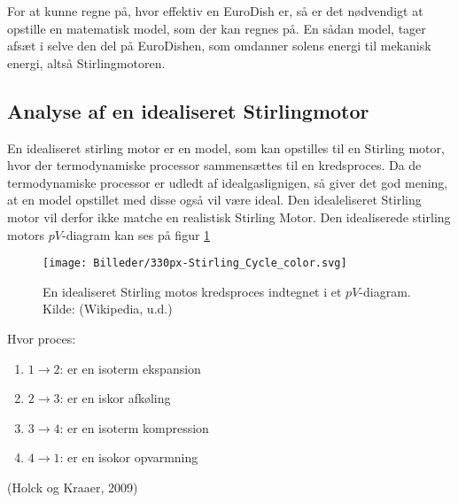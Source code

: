 \documentclass[SRC.tex]{subfiles}
\begin{document}
	
	For at kunne regne på, hvor effektiv en EuroDish er, så er det nødvendigt at opstille
	en matematisk model, som der kan regnes på. En sådan model, tager afsæt i selve den del
	på EuroDishen, som omdanner solens energi til mekanisk energi, altså Stirlingmotoren. 
	
	\subsection{Analyse af en idealiseret Stirlingmotor}
	En idealiseret stirling motor er en model, som kan opstilles til en 
	Stirling motor, hvor der termodynamiske processor sammensættes til en kredsproces. Da 
	de termodynamiske processor er udledt af idealgaslignigen, så giver det 
	god mening, at en model opstillet med disse også vil være ideal. Den idealeliseret Stirling motor vil derfor ikke matche en realistisk Stirling Motor. Den idealiserede stirling motors \(pV\)-diagram kan ses på figur \ref{fig:stirlingcycle}
	
	\begin{figure}[h!]
		\centering
		\texttt{[image: Billeder/330px-Stirling\_Cycle\_color.svg]}
		\caption{En idealiseret Stirling motos kredsproces indtegnet i et \(pV\)-diagram. Kilde: (Wikipedia, u.d.) }
		\label{fig:stirlingcycle}
	\end{figure}
	

	Hvor proces:
	\begin{enumerate}[]
		\item \quad \(1 \rightarrow 2\): er en isoterm ekspansion
		\item \quad \(2 \rightarrow 3\): er en iskor afkøling
		\item \quad \(3 \rightarrow 4\): er en isoterm kompression
		\item \quad \(4 \rightarrow 1\): er en isokor opvarmning
	\end{enumerate}
	(Holck og Kraaer, 2009)
	
	
\end{document}
